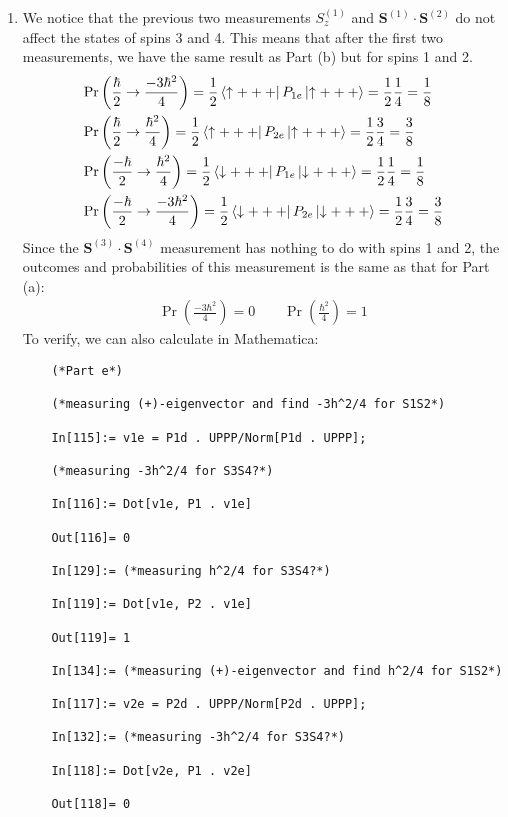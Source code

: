 \documentclass{article}
\theoremstyle{definition}
\newcommand{\f}[2]{\frac{#1}{#2}}
\newcommand{\lp}{\left(}
\newcommand{\rp}{\right)}
\begin{document}
\begin{enumerate}[label=(\alph*)]
	
	\item We  notice that the previous two measurements $S_z^{(1)}$ and $\mathbf{S}^{(1)}\cdot \mathbf{S}^{(2)}$ do not affect the states of spins 3 and 4. This means that after the first two measurements, we have the same result as Part (b) but for spins 1 and 2. 
	\begin{align*}
	&\Pr\lp \f{\hbar}{2} \to \f{-3\hbar^2}{4} \rp = \f{1}{2} \bra{\uparrow +++} P_{1e} \ket{\uparrow +++} = \f{1}{2}\f{1}{4} = \f{1}{8} \\
	&\Pr\lp \f{\hbar}{2} \to \f{\hbar^2}{4} \rp =  \f{1}{2} \bra{\uparrow +++} P_{2e} \ket{\uparrow +++} = \f{1}{2}\f{3}{4} = \f{3}{8}\\
	&\Pr\lp \f{-\hbar}{2} \to \f{\hbar^2}{4} \rp =  \f{1}{2} \bra{\downarrow +++} P_{1e} \ket{\downarrow +++} = \f{1}{2}\f{1}{4} = \f{1}{8}\\
	&\Pr\lp \f{-\hbar}{2} \to \f{-3\hbar^2}{4} \rp =  \f{1}{2} \bra{\downarrow +++} P_{2e} \ket{\downarrow +++} = \f{1}{2}\f{3}{4} = \f{3}{8}
	\end{align*}
	Since the $\mathbf{S}^{(3)}\cdot \mathbf{S}^{(4)}$ measurement has nothing to do with spins 1 and 2, the outcomes and probabilities of this measurement is the same as that for Part (a):
	\begin{align*}
	\boxed{\Pr\lp \f{-3\hbar^2}{4} \rp = 0} \quad\quad \boxed{\Pr\lp \f{\hbar^2}{4} \rp = 1}
	\end{align*}
	To verify, we can also calculate in Mathematica:
	\begin{lstlisting}
	(*Part e*)
	
	(*measuring (+)-eigenvector and find -3h^2/4 for S1S2*)
	
	In[115]:= v1e = P1d . UPPP/Norm[P1d . UPPP];
	
	(*measuring -3h^2/4 for S3S4?*)
	
	In[116]:= Dot[v1e, P1 . v1e]
	
	Out[116]= 0
	
	In[129]:= (*measuring h^2/4 for S3S4?*)
	
	In[119]:= Dot[v1e, P2 . v1e]
	
	Out[119]= 1
	
	In[134]:= (*measuring (+)-eigenvector and find h^2/4 for S1S2*)
	
	In[117]:= v2e = P2d . UPPP/Norm[P2d . UPPP];
	
	In[132]:= (*measuring -3h^2/4 for S3S4?*)
	
	In[118]:= Dot[v2e, P1 . v2e]
	
	Out[118]= 0
	

\end{lstlisting}
\end{enumerate}
\end{document}
